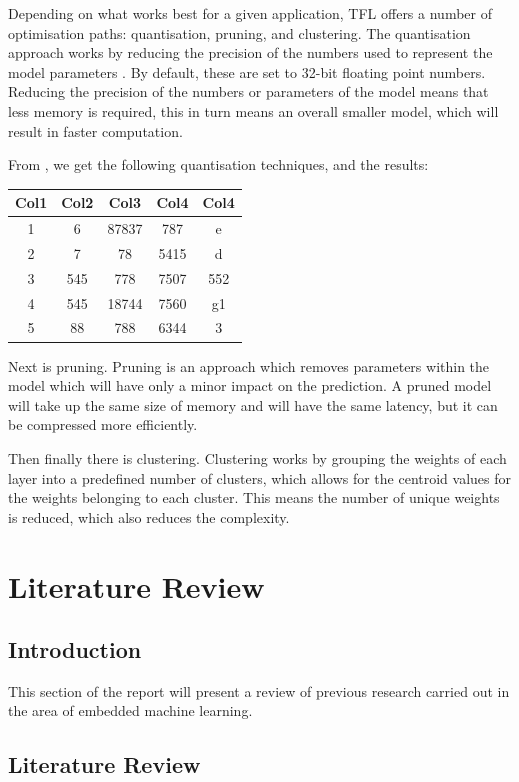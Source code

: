 \documentclass[conference]{IEEEtran}
\begin{document}
Depending on what works best for a given application, TFL offers a number of optimisation paths: quantisation, pruning, and clustering. The quantisation approach works by reducing the precision of the numbers used to represent the model parameters \cite{tfl2}. By default, these are set to 32-bit floating point numbers. Reducing the precision of the numbers or parameters of the model means that less memory is required, this in turn means an overall smaller model, which will result in faster computation.

From \cite{tfl1}, we get the following quantisation techniques, and the results:

\begin{tabular}{||c c c c c||} 
 \hline
 Col1 & Col2 & Col3 & Col4 & Col4 \\ [1.0ex] 
 \hline\hline
 1 & 6 & 87837 & 787 & e\\ 
 \hline
 2 & 7 & 78 & 5415 & d \\
 \hline
 3 & 545 & 778 & 7507 & 552\\
 \hline
 4 & 545 & 18744 & 7560 & g1 \\
 \hline
 5 & 88 & 788 & 6344 & 3\\ [1ex] 
 \hline
\end{tabular}


Next is pruning. Pruning is an approach which removes parameters within the model which will have only a minor impact on the prediction. A pruned model will take up the same size of memory and will have the same latency, but it can be compressed more efficiently.

Then finally there is clustering. Clustering works by grouping the weights of each layer into a predefined number of clusters, which allows for the centroid values for the weights belonging to each cluster. This means the number of unique weights is reduced, which also reduces the complexity.

\section{Literature Review}
\subsection{Introduction}
This section of the report will present a review of previous research carried out in the area of embedded machine learning.

\subsection{Literature Review}






\printbibliography
\vspace{12pt}
\end{document}
